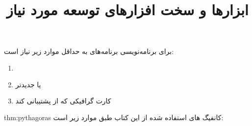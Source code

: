 \title{
    \LARGE
    \textbf{ابزارها و سخت افزارهای توسعه مورد نیاز}
} \rullFillWithLine[0.5em]{1pt}
\textbf{\vspace{12pt}}

{
    \Large
    برای برنامه‌نویسی برنامه‌های  به حداقل موارد زیر نیاز است:
    \begin{enumerate}
        \item {}
        \item { یا جدیدتر}
        \item {کارت گرافیکی که از  پشتیبانی کند}
    \end{enumerate}
}

\textbf{\vspace{6pt}}
\begin{theo}{thm:pythagoras}
    \Large
    کانفیگ های استفاده شده از این کتاب طبق موارد زیر است:
\end{theo}
\textbf{\vspace{6pt}}


